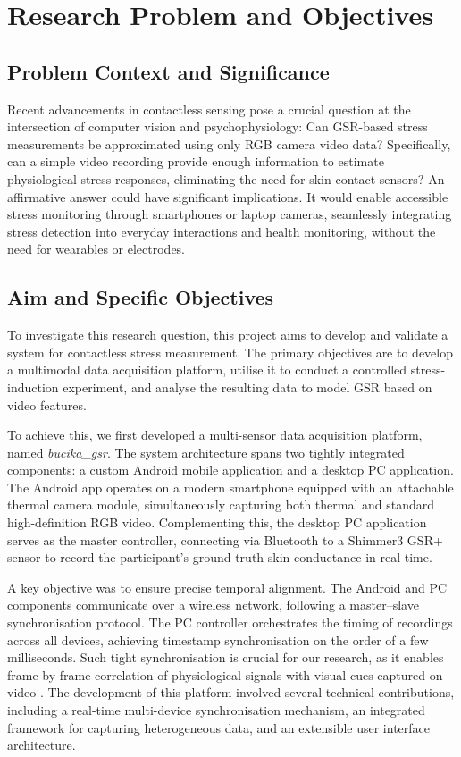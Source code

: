 \documentclass[11pt,a4paper]{report}
\begin{document}
\section{Research Problem and Objectives}

\subsection{Problem Context and Significance}

Recent advancements in contactless sensing pose a crucial question at the intersection of computer vision and psychophysiology: Can GSR-based stress measurements be approximated using only RGB camera video data? Specifically, can a simple video recording provide enough information to estimate physiological stress responses, eliminating the need for skin contact sensors? An affirmative answer could have significant implications. It would enable accessible stress monitoring through smartphones or laptop cameras, seamlessly integrating stress detection into everyday interactions and health monitoring, without the need for wearables or electrodes.

\subsection{Aim and Specific Objectives}

To investigate this research question, this project aims to develop and validate a system for contactless stress measurement. The primary objectives are to develop a multimodal data acquisition platform, utilise it to conduct a controlled stress-induction experiment, and analyse the resulting data to model GSR based on video features.

To achieve this, we first developed a multi-sensor data acquisition platform, named \textit{bucika\_gsr}. The system architecture spans two tightly integrated components: a custom Android mobile application and a desktop PC application. The Android app operates on a modern smartphone equipped with an attachable thermal camera module, simultaneously capturing both thermal and standard high-definition RGB video. Complementing this, the desktop PC application serves as the master controller, connecting via Bluetooth to a Shimmer3 GSR+ sensor to record the participant's ground-truth skin conductance in real-time.

A key objective was to ensure precise temporal alignment. The Android and PC components communicate over a wireless network, following a master--slave synchronisation protocol. The PC controller orchestrates the timing of recordings across all devices, achieving timestamp synchronisation on the order of a few milliseconds. Such tight synchronisation is crucial for our research, as it enables frame-by-frame correlation of physiological signals with visual cues captured on video \cite{Gravina2017}. The development of this platform involved several technical contributions, including a real-time multi-device synchronisation mechanism, an integrated framework for capturing heterogeneous data, and an extensible user interface architecture.
\end{document}
